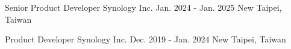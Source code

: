 

\begin{cventries}

  \cventry
    {Senior Product Developer} %
    {Synology Inc.} %
    {Jan. 2024 - Jan. 2025} %
    {New Taipei, Taiwan} %
    {
    }
    \vspace{-1.2em}

  \cventry
    {Product Developer} %
    {Synology Inc.} %
    {Dec. 2019 - Jan. 2024} %
    {New Taipei, Taiwan} %
    {
    }
    \vspace{-1.2em}

\end{cventries}